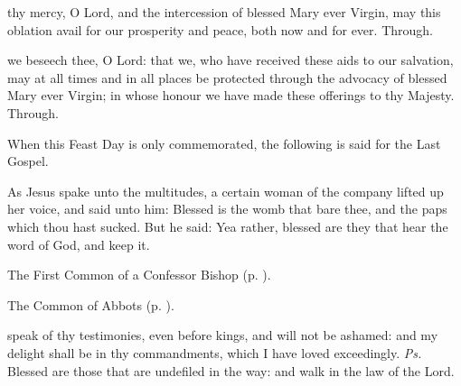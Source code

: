 \secret

\vspace{-0.1\baselineskip}

 thy mercy, O Lord, and the intercession of blessed Mary ever Virgin, may this oblation avail for our prosperity and peace, both now and for ever. Through.

\postcommunion
{} we beseech thee, O Lord: that we, who have received these aids to our salvation, may at all times and in all places be protected through the advocacy of blessed Mary ever Virgin; in whose honour we have made these offerings to thy Majesty. Through.

\begin{rubric}
	When this Feast Day is only commemorated, the following is said for the Last Gospel.
\end{rubric}


\vspace{-0.2\baselineskip}


\vspace{-0.1\baselineskip}

 As Jesus spake unto the multitudes, a certain woman of the company lifted up her voice, and said unto him: Blessed is the womb that bare thee, and the paps which thou hast sucked. But he said: Yea rather, blessed are they that hear the word of God, and keep it.



\begin{rubric}
	The First Common of a Confessor Bishop (p. \pageref{CommonConfessorBishopI}).
\end{rubric}



\begin{rubric}
	The Common of Abbots (p. \pageref{CommonAbbots}).
\end{rubric}



\introit
{} speak of thy testimonies, even before kings, and will not be ashamed: and my delight shall be in thy commandments, which I have loved exceedingly. \textit{Ps.} Blessed are those that are undefiled in the way: and walk in the law of the Lord.

